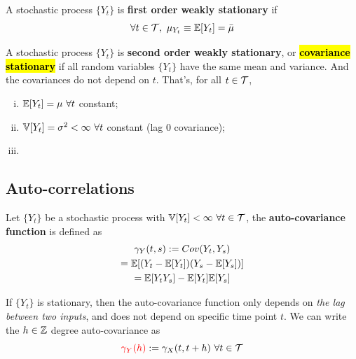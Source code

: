 \documentclass[11pt]{article}
\begin{document}
		
		\begin{definition}
			A stochastic process $\{Y_t\}$ is \textbf{first order weakly stationary} if
			\begin{equation}
				\forall t \in \mathcal{{T}},\ \mu_{Y_t} \equiv \mathbb{E}[{Y_t}] = \bar{\mu}
			\end{equation}
		\end{definition}
		
		\begin{definition}
			A stochastic process $\{Y_t\}$ is \textbf{second order weakly stationary}, or \hl{\textbf{covariance stationary}} if all random variables $\{Y_t\}$ have the same mean and variance. And the covariances do not depend on $t$.
			That's, for all $t \in \mathcal{{T}}$,
			\begin{enumerate}[(i)]
				\item $\mathbb{E}[{Y_t}] = \mu\ \forall t$ constant;
				\item $\var{Y_t} = \sigma^2 < \infty\ \forall t$ constant (lag 0 covariance);
				\item {}
			\end{enumerate}
		\end{definition}
		
		\subsection{Auto-correlations}
		
		\begin{definition}
			Let $\{Y_t\}$ be a stochastic process with $\mathbb{V}[{Y_t}] < \infty\ \forall t \in \mathcal{{T}}$, the \textbf{auto-covariance function} is defined as
			\begin{gather}
				\gamma_Y(t, s) := Cov(Y_t, Y_s) \\
				= \mathbb{E}[{(Y_t - \mathbb{E}[{Y_t}])(Y_s - \mathbb{E}[{Y_s}])}] \\
				= \mathbb{E}[{Y_t Y_s}] - \mathbb{E}[{Y_t}] \mathbb{E}[{Y_s}]
			\end{gather}
		\end{definition}
		
		\begin{lemma}
			If $\{Y_t\}$ is stationary, then the auto-covariance function only depends on \emph{the lag between two inputs}, and does not depend on specific time point $t$. We can write the $h \in \mathbb{Z}$ degree auto-covariance as 
			\begin{equation}
				\textcolor{red}{\gamma_Y(h)} := \gamma_X(t, t+h)\ \forall t \in \mathcal{{T}}
			\end{equation}
		\end{lemma}
	
\end{document}
